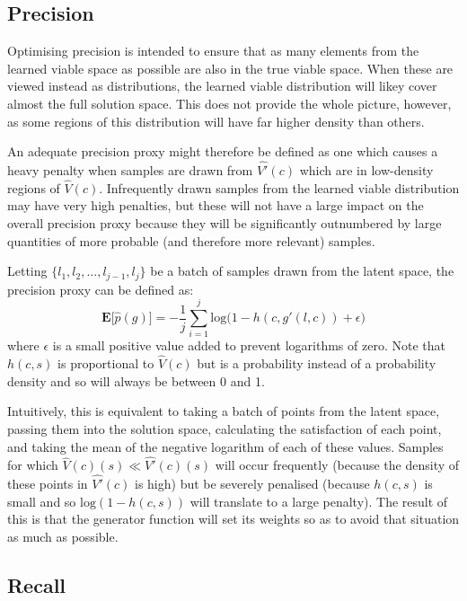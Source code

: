 \documentclass[../../main.tex]{subfiles}
\begin{document}
\subsection{Precision} \label{subsection:precision}

Optimising precision is intended to ensure that as many elements from the learned viable space as possible are also in the true viable space.
When these are viewed instead as distributions, the learned viable distribution will likey cover almost the full solution space.
This does not provide the whole picture, however, as some regions of this distribution will have far higher density than others.

An adequate precision proxy might therefore be defined as one which causes a heavy penalty when samples are drawn from $\hat{V'}(c)$ which are in low-density regions of $\hat{V}(c)$.
Infrequently drawn samples from the learned viable distribution may have very high penalties, but these will not have a large impact on the overall precision proxy because they will be significantly outnumbered by large quantities of more probable (and therefore more relevant) samples.

Letting $\{l_1,l_2,...,l_{j-1},l_j\}$ be a batch of samples drawn from the latent space, the precision proxy can be defined as:
$$\textbf{E}\big[\hat{p}(g)\big]=-\frac{1}{j}\sum_{i=1}^{j}\text{log}\big(1-h(c,g'(l,c))+\epsilon\big)$$
where $\epsilon$ is a small positive value added to prevent logarithms of zero.
Note that $h(c,s)$ is proportional to $\hat{V}(c)$ but is a probability instead of a probability density and so will always be between 0 and 1.

Intuitively, this is equivalent to taking a batch of points from the latent space, passing them into the solution space, calculating the satisfaction of each point, and taking the mean of the negative logarithm of each of these values.
Samples for which $\hat{V}(c)(s)\ll\hat{V'}(c)(s)$ will occur frequently (because the density of these points in $\hat{V'}(c)$ is high) but be severely penalised (because $h(c,s)$ is small and so $\text{log}(1-h(c,s))$ will translate to a large penalty).
The result of this is that the generator function will set its weights so as to avoid that situation as much as possible.

\subsection{Recall} \label{subsection:recall}
\end{document}

